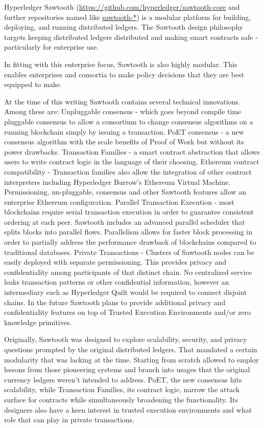 Hyperledger Sawtooth (\url{https://github.com/hyperledger/sawtooth-core} and further repositories named like \url{sawtooth-*}) is a modular platform for building, deploying, and running distributed ledgers. The Sawtooth design philosophy targets keeping distributed ledgers distributed and making smart contracts safe - particularly for enterprise use.

In fitting with this enterprise focus, Sawtooth is also highly modular. This enables enterprises and consortia to make policy decisions that they are best equipped to make.

At the time of this writing Sawtooth contains several technical innovations. Among these are:
Unpluggable consensus - which goes beyond compile time pluggable consensus to allow a consortium to change consensus algorithms on a running blockchain simply by issuing a transaction.
PoET consensus - a new consensus algorithm with the scale benefits of Proof of Work but without its power drawbacks.
Transaction Families - a smart contract abstraction that allows users to write contract logic in the language of their choosing.
Ethereum contract compatibility - Transaction families also allow the integration of other contract interpreters including Hyperledger Burrow's Ethereum Virtual Machine. Permissioning, un-pluggable, consensus and other Sawtooth features allow an enterprise Ethereum configuration.
Parallel Transaction Execution - most blockchains require serial transaction execution in order to guarantee consistent ordering at each peer. Sawtooth includes an advanced parallel scheduler that splits blocks into parallel flows. Parallelism allows for faster block processing in order to partially address the performance drawback of blockchains compared to traditional databases.
Private Transactions - Clusters of Sawtooth nodes can be easily deployed with separate permissioning. This provides privacy and confidentiality among participants of that distinct chain. No centralized service leaks transaction patterns or other confidential information, however an intermediary such as Hyperledger Quilt would be required to connect disjoint chains. In the future Sawtooth plans to provide additional privacy and confidentiality features on top of Trusted Execution Environments and/or zero knowledge primitives.

Originally, Sawtooth was designed to explore scalability, security, and privacy questions prompted by the original distributed ledgers. That mandated a certain modularity that was lacking at the time. Starting from scratch allowed to employ lessons from those pioneering systems and branch into usages that the original currency ledgers weren't intended to address. PoET, the new consensus hits scalability, while Transaction Families, its contract logic, narrow the attack surface for contracts while simultaneously broadening the functionality. Its designers also have a keen interest in trusted execution environments and what role that can play in private transactions.

